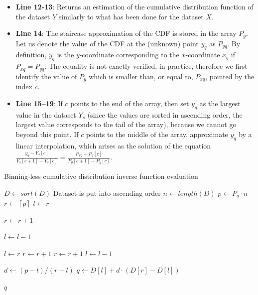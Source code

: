 \documentclass[10pt,final]{siamltex}
\begin{document}
\begin{itemize}
  \item \textbf{Line 12-13}: Returns an estimation of the cumulative distribution function of the dataset $Y$ similarly to what has been done for the dataset $X$.
  \item \textbf{Line 14}: The staircase approximation of the CDF is stored in the array $P_y$. Let us denote the value of the CDF at the (unknown) point $y_q$ as $P_{yq}$. By definition, $y_q$ is the $y$-coordinate corresponding to the $x$-coordinate $x_q$ if $P_{xq} = P_{yq}$. The equality is not exactly verified, in practice, therefore we first identify the value of $P_y$ which is smaller than, or equal to, $P_{xq}$, pointed by the index $c$.
  \item \textbf{Line 15--19}: If $c$ points to the end of the array, then set $y_q$ as the largest value in the dataset $Y_s$ (since the values are sorted in ascending order, the largest value corresponds to the tail of the array), because we cannot go beyond this point. If $c$ points to the middle of the array, approximate $y_q$ by a linear interpolation, which arises as the solution of the equation $\tfrac{y_q-Y_s[c]}{Y_s[c+1]-Y_s[c]}=\tfrac{P_{xq}-P_y[c]}{P_y[c+1]-P_y[c]}$.
\end{itemize}
%



\begin{algorithm}
  \caption{Binning-less cumulative distribution inverse function evaluation}
  \label{invcdf_algo}
  \begin{algorithmic}[1]
    \State $D \gets sort(D)$
    \Comment Dataset is put into ascending order
    \State $n \gets length(D)$
    \State $p \gets P_q \cdot n$
    \State $r \gets  \left \lceil{p}\right \rceil$
    \EndIf
    \State $l \gets r$

    \State $ r \gets r + 1$
    \EndWhile

    \State $l \gets l - 1$
    \EndWhile

    \State $l \gets r$
    \State $r \gets r+1$
    \State $r \gets r + 1$
    \EndWhile
    \Else
    \State $ l \gets l - 1$
    \EndIf

    \State $d \gets (p-l)/(r-l) $
    \State $q \gets D[l] + d \cdot (D[r]-D[l])$

    \State \Return $q$
    \EndFunction
\end{algorithmic}
\end{algorithm}
\end{document}
